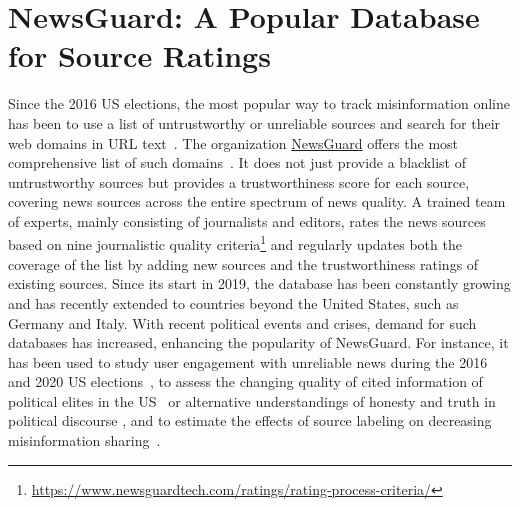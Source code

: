 \documentclass[12pt,twoside]{article}
\begin{document}
\section{NewsGuard: A Popular Database for Source Ratings}
Since the 2016 US elections, the most popular way to track misinformation online has been to use a list of untrustworthy or unreliable sources and search for their web domains in URL text~\citep{lasserSocialMediaSharing2022c, grinbergFakeNewsTwitter2019, guessExposureUntrustworthyWebsites2020a, guessCrackingOpenNews2021, shaoSpreadLowcredibilityContent2018, yangCOVID19InfodemicTwitter2021a}. 
The organization \href{https://www.newsguardtech.com/}{NewsGuard} offers the most comprehensive list of such domains~\citep{linHighLevelCorrespondence2023a}. 
It does not just provide a blacklist of untrustworthy sources but provides a trustworthiness score for each source, covering news sources across the entire spectrum of news quality. 
A trained team of experts, mainly consisting of journalists and editors, rates the news sources based on nine journalistic quality criteria\footnote{\href{https://web.archive.org/web/20240131155450/https://www.newsguardtech.com/ratings/rating-process-criteria/}{https://www.newsguardtech.com/ratings/rating-process-criteria/}} and regularly updates both the coverage of the list by adding new sources and the trustworthiness ratings of existing sources.
Since its start in 2019, the database has been constantly growing and has recently extended to countries beyond the United States, such as Germany and Italy. 
With recent political events and crises, demand for such databases has increased, enhancing the popularity of NewsGuard. 
For instance, it has been used to study user engagement with unreliable news during the 2016 and 2020 US elections~\citep{pratelliSwingingStatesDoes2023, robertsonUsersChooseEngage2023a}, to assess the changing quality of cited information of political elites in the US~\citep{lasserSocialMediaSharing2022c} or alternative understandings of honesty and truth in political discourse \citep{lasserAlternativeConceptionsHonesty2023}, and to estimate the effects of source labeling on decreasing misinformation sharing~\citep{aslettNewsCredibilityLabels2022a, celadinDisplayingNewsSource2023}.
\end{document}

